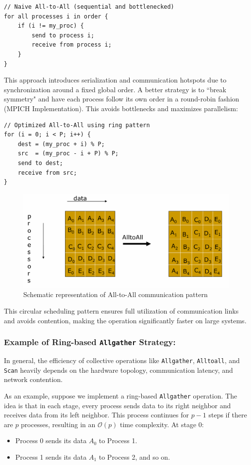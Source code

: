 \documentclass[12pt]{book}
\begin{document}
\begin{lstlisting}[style=cppstyle]
// Naive All-to-All (sequential and bottlenecked)
for all processes i in order {
    if (i != my_proc) {
        send to process i;
        receive from process i;
    }
}
\end{lstlisting}

This approach introduces serialization and communication hotspots due to synchronization around a fixed global order. A better strategy is to ``break symmetry" and have each process follow its own order in a round-robin fashion (MPICH Implementation). This avoids bottlenecks and maximizes parallelism:

\begin{lstlisting}[style=cppstyle]
// Optimized All-to-All using ring pattern
for (i = 0; i < P; i++) {
    dest = (my_proc + i) % P;
    src  = (my_proc - i + P) % P;
    send to dest;
    receive from src;
}
\end{lstlisting}

\begin{figure}[H]
    \centering
    \includegraphics[width=0.65\linewidth]{images/alltoall.png}
    \caption{Schematic representation of All-to-All communication pattern}
    \label{fig:alltoall}
\end{figure}

This circular scheduling pattern ensures full utilization of communication links and avoids contention, making the operation significantly faster on large systems.

\subsubsection{Example of Ring-based \texttt{Allgather} Strategy:}
In general, the efficiency of collective operations like \texttt{Allgather}, \texttt{Alltoall}, and \texttt{Scan} heavily depends on the hardware topology, communication latency, and network contention.

As an example, suppose we implement a ring-based \texttt{Allgather} operation. The idea is that in each stage, every process sends data to its right neighbor and receives data from its left neighbor. This process continues for $p - 1$ steps if there are $p$ processes, resulting in an $\mathcal{O}(p)$ time complexity.
At stage 0:
\begin{itemize}
    \item Process 0 sends its data $A_0$ to Process 1.
    \item Process 1 sends its data $A_1$ to Process 2, and so on.
\end{itemize}
\end{document}
